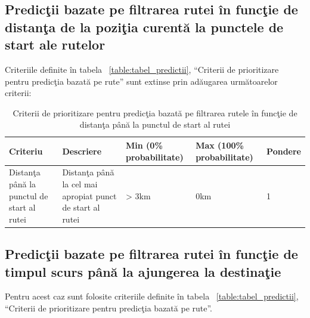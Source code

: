 		
		\subsection{Predicţii bazate pe filtrarea rutei în funcţie de distanţa de la poziţia curentă la punctele de start ale rutelor}
		Criteriile definite în tabela ~\ref{table:tabel_predictii}, ``Criterii de prioritizare pentru predicţia bazată pe rute'' sunt extinse prin adăugarea următoarelor criterii:
		
		\begin{table}[!h]
		\caption{Criterii de prioritizare pentru predicţia bazată pe filtrarea rutele în funcţie de distanţa până la punctul de start al rutei}
		\centering
		\begin{tabular}{ | m{} | m{} | m{3,22cm} | m{} | m{} | }
		\hline
		\textbf{Criteriu} & \textbf{Descriere} & \textbf{Min (0\% probabilitate)} & \textbf{Max (100\% probabilitate)} & \textbf{Pondere} \\ 
		\hline
		 Distanţa până la punctul de start al rutei & Distanţa până la cel mai apropiat punct de start al rutei &> 3km & 0km & 1 \\
		\hline
		\end{tabular}
		\end{table}
		
		\subsection{Predicţii bazate pe filtrarea rutei în funcţie de timpul scurs până la ajungerea la destinaţie}
		Pentru acest caz sunt folosite criteriile definite în tabela ~\ref{table:tabel_predictii}, ``Criterii de prioritizare pentru predicţia bazată pe rute''.
		
		
		
		


	